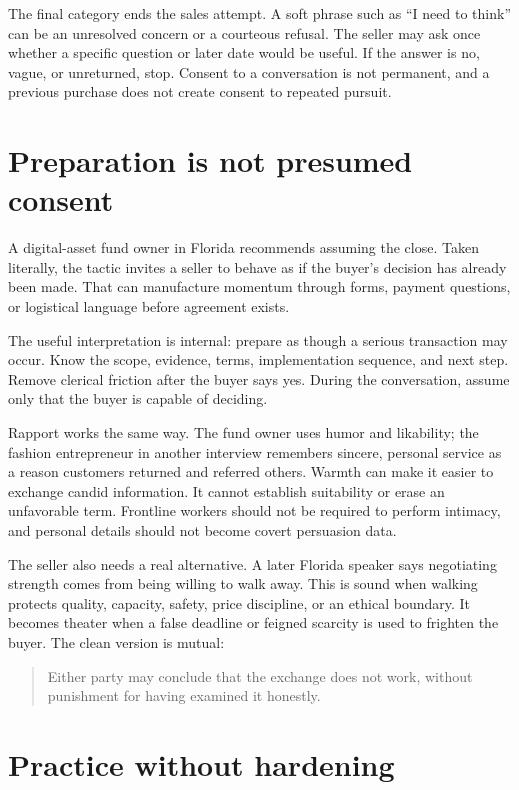 The final category ends the sales attempt. A soft phrase such as ``I need to
think'' can be an unresolved concern or a courteous refusal. The seller may ask
once whether a specific question or later date would be useful. If the answer
is no, vague, or unreturned, stop. Consent to a conversation is not permanent,
and a previous purchase does not create consent to repeated pursuit.

\section{Preparation is not presumed consent}

A digital-asset fund owner in Florida recommends assuming the close. Taken
literally, the tactic invites a seller to behave as if the buyer's decision has
already been made. That can manufacture momentum through forms, payment
questions, or logistical language before agreement exists.

The useful interpretation is internal: prepare as though a serious transaction
may occur. Know the scope, evidence, terms, implementation sequence, and next
step. Remove clerical friction after the buyer says yes. During the
conversation, assume only that the buyer is capable of deciding.

Rapport works the same way. The fund owner uses humor and likability; the
fashion entrepreneur in another interview remembers sincere, personal service
as a reason customers returned and referred others. Warmth can make it easier
to exchange candid information. It cannot establish suitability or erase an
unfavorable term. Frontline workers should not be required to perform intimacy,
and personal details should not become covert persuasion data.

The seller also needs a real alternative. A later Florida speaker says
negotiating strength comes from being willing to walk away. This is sound when
walking protects quality, capacity, safety, price discipline, or an ethical
boundary. It becomes theater when a false deadline or feigned scarcity is used
to frighten the buyer. The clean version is mutual:

\begin{quote}
Either party may conclude that the exchange does not work, without punishment
for having examined it honestly.
\end{quote}

\section{Practice without hardening}

